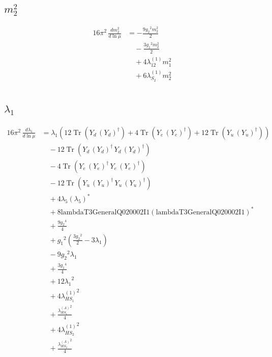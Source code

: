 \documentclass[10pt,a4paper]{article}
\begin{document}
\subsection*{$m_2^2$}
\begin{align*}
16\pi^2\,\frac{d m_2^2}{d\ln\mu} &=-\frac{9 {g_2}^2 {m_2^2}}{2} \\
&\quad -\frac{3 {g_1}^2 {m_2^2}}{2} \\
&\quad +4 {\lambda_{12}^{(1)}} {m_1^2} \\
&\quad +6 {\lambda_{S_2}^{(1)}} {m_2^2} \\
\end{align*}
\subsection*{$\lambda_1$}
\begin{align*}
16\pi^2\,\frac{d \lambda_1}{d\ln\mu} &={\lambda_1} (12 \operatorname{Tr}\!\left({Y_d}\,\left({Y_d}\right)^{\dagger}\right)+4 \operatorname{Tr}\!\left({Y_e}\,\left({Y_e}\right)^{\dagger}\right)+12 \operatorname{Tr}\!\left({Y_u}\,\left({Y_u}\right)^{\dagger}\right)) \\
&\quad -12 \operatorname{Tr}\!\left({Y_d}\,\left({Y_d}\right)^{\dagger}\,{Y_d}\,\left({Y_d}\right)^{\dagger}\right) \\
&\quad -4 \operatorname{Tr}\!\left({Y_e}\,\left({Y_e}\right)^{\dagger}\,{Y_e}\,\left({Y_e}\right)^{\dagger}\right) \\
&\quad -12 \operatorname{Tr}\!\left({Y_u}\,\left({Y_u}\right)^{\dagger}\,{Y_u}\,\left({Y_u}\right)^{\dagger}\right) \\
&\quad +4 {\lambda_5} \left({\lambda_5}\right)^{*} \\
&\quad +8 \text{lambdaT3GeneralQ020002I1} \left(\text{lambdaT3GeneralQ020002I1}\right)^{*} \\
&\quad +\frac{9 {g_2}^4}{4} \\
&\quad +{g_1}^2 \left(\frac{3 {g_2}^2}{2}-3 {\lambda_1}\right) \\
&\quad -9 {g_2}^2 {\lambda_1} \\
&\quad +\frac{3 {g_1}^4}{4} \\
&\quad +12 {\lambda_1}^2 \\
&\quad +4 {\lambda_{HS_1}^{(1)}}^2 \\
&\quad +\frac{{\lambda_{HS_1}^{(A)}}^2}{4} \\
&\quad +4 {\lambda_{HS_2}^{(1)}}^2 \\
&\quad +\frac{{\lambda_{HS_2}^{(A)}}^2}{4} \\
\end{align*}
\end{document}
